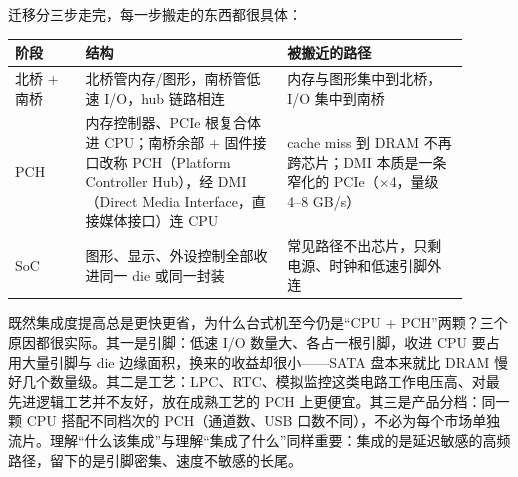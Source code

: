 迁移分三步走完，每一步搬走的东西都很具体：

\begin{longtable}{L{0.14\linewidth}L{0.40\linewidth}L{0.36\linewidth}}
\toprule
阶段 & 结构 & 被搬近的路径 \\
\midrule
北桥 + 南桥 & 北桥管内存/图形，南桥管低速 I/O，hub 链路相连 & 内存与图形集中到北桥，I/O 集中到南桥 \\
PCH & 内存控制器、PCIe 根复合体进 CPU；南桥余部 + 固件接口改称 PCH（Platform Controller Hub），经 DMI（Direct Media Interface，直接媒体接口）连 CPU & cache miss 到 DRAM 不再跨芯片；DMI 本质是一条窄化的 PCIe（$\times$4，量级 4--8 GB/s） \\
SoC & 图形、显示、外设控制全部收进同一 die 或同一封装 & 常见路径不出芯片，只剩电源、时钟和低速引脚外连 \\
\bottomrule
\end{longtable}

既然集成度提高总是更快更省，为什么台式机至今仍是“CPU + PCH”两颗？三个原因都很实际。其一是引脚：低速 I/O 数量大、各占一根引脚，收进 CPU 要占用大量引脚与 die 边缘面积，换来的收益却很小——SATA 盘本来就比 DRAM 慢好几个数量级。其二是工艺：LPC、RTC、模拟监控这类电路工作电压高、对最先进逻辑工艺并不友好，放在成熟工艺的 PCH 上更便宜。其三是产品分档：同一颗 CPU 搭配不同档次的 PCH（通道数、USB 口数不同），不必为每个市场单独流片。理解“什么该集成”与理解“集成了什么”同样重要：集成的是延迟敏感的高频路径，留下的是引脚密集、速度不敏感的长尾。

